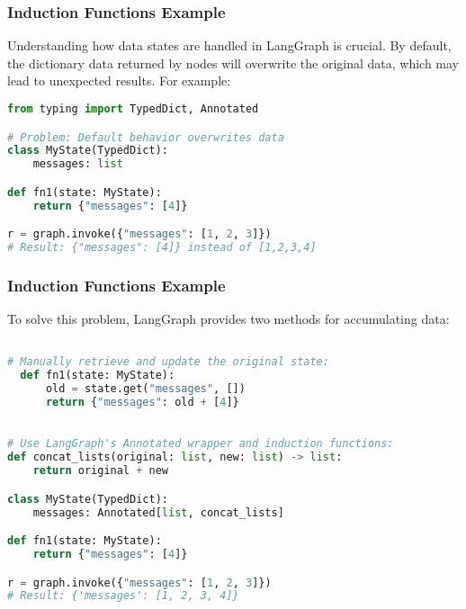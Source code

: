 \begin{frame}[fragile]\frametitle{Induction Functions Example}

Understanding how data states are handled in LangGraph is crucial. By default, the dictionary data returned by nodes will overwrite the original data, which may lead to unexpected results. For example:

\begin{lstlisting}[language=Python, basicstyle=\tiny]
from typing import TypedDict, Annotated

# Problem: Default behavior overwrites data
class MyState(TypedDict):
    messages: list

def fn1(state: MyState):
    return {"messages": [4]}

r = graph.invoke({"messages": [1, 2, 3]})
# Result: {"messages": [4]} instead of [1,2,3,4]

\end{lstlisting}
\end{frame}


\begin{frame}[fragile]\frametitle{Induction Functions Example}

To solve this problem, LangGraph provides two methods for accumulating data:

\begin{lstlisting}[language=Python, basicstyle=\tiny]

# Manually retrieve and update the original state:
  def fn1(state: MyState):
      old = state.get("messages", [])
      return {"messages": old + [4]}

	
# Use LangGraph's Annotated wrapper and induction functions:
def concat_lists(original: list, new: list) -> list:
    return original + new

class MyState(TypedDict):
    messages: Annotated[list, concat_lists]

def fn1(state: MyState):
    return {"messages": [4]}

r = graph.invoke({"messages": [1, 2, 3]})
# Result: {'messages': [1, 2, 3, 4]}
      \end{lstlisting}
\end{frame}

